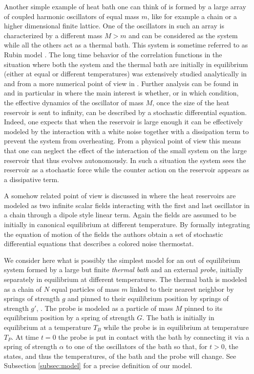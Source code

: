 \documentclass[11pt]{article}
\numberwithin{equation}{section}
\def\red{\textcolor{red}}
\def\red{}
\numberwithin{theorem}{section}
\def\sp{g}
\def\Sp{G}
\begin{document}
Another simple example of heat bath one can think of is formed by a large array of coupled harmonic oscillators \red{of
equal mass $m$}, like for example a chain or a higher dimensional finite lattice. One of the oscillators in such an
array \red{is characterized by a different mass $M>m$ and} can be considered as the system while all the others act as a
thermal bath. \red{This system is sometime referred to as Rubin model \cite{Rubin1,Rubin2}. The long time behavior of
the  correlation functions in the situation where both the system and the thermal bath are initially in equilibrium
(either at equal or different temperatures) was extensively studied analytically in \cite{Rubin1,Rubin2,Caldeira} and
from a more numerical point of view in \cite{Das,Dhar,Onofrio}. Further analysis can be found in \cite{TK62,TH62} and in
particular in \cite{FKM65} where the main interest is whether, or in which condition, the effective dynamics of the
oscillator of mass $M$,} once the size of the heat reservoir is sent to infinity, can be described by a stochastic
differential equation. Indeed, one expects that when the reservoir is large enough it can be effectively modeled by
the interaction with a white noise together with a dissipation term to prevent the system from overheating. From a
physical point of view this means that one can neglect the effect of the interaction of the small system on the large
reservoir that thus evolves autonomously. In such a situation the system sees the reservoir as a stochastic force while
the counter action on the reservoir appears as a dissipative term.

A somehow related point of view is discussed in \cite{EPR-B99} where the heat reservoirs are modeled as two infinite
scalar fields interacting with the first and last oscillator in a chain through a dipole style linear term. Again
the fields are assumed to be initially in canonical equilibrium at different temperature. By formally integrating the
equation of motion of the fields the authors obtain a set of stochastic differential equations that describes a colored
noise thermostat.

\red{We consider here what is possibly the simplest model for an out of equilibrium system formed by a large but finite
{\it thermal bath} and an external {\it probe}, initially separately in equilibrium at different temperatures. The
thermal bath is modeled as a chain of $N$ equal particles of mass $m$ linked to their nearest neighbor by springs of
strength $\sp$ and pinned to their equilibrium position by springs of strength $\sp'$, \cite{Rubin1}. }The probe is
modeled as a particle of mass $M$ pinned to its equilibrium position by a spring of strength $\Sp$. The bath is
initially in equilibrium at a temperature $T_B$ while the probe is in equilibrium at temperature $T_P$. At time $t=0$
the probe is put in contact with the bath by connecting it via a spring of strength $\alpha$ to one of the oscillators
of the bath \red{so that, for $t>0$, the states, and thus the temperatures, of the bath and the probe will change. See 
Subsection \ref{subsec:model} for a precise definition of our model.}
\end{document}
